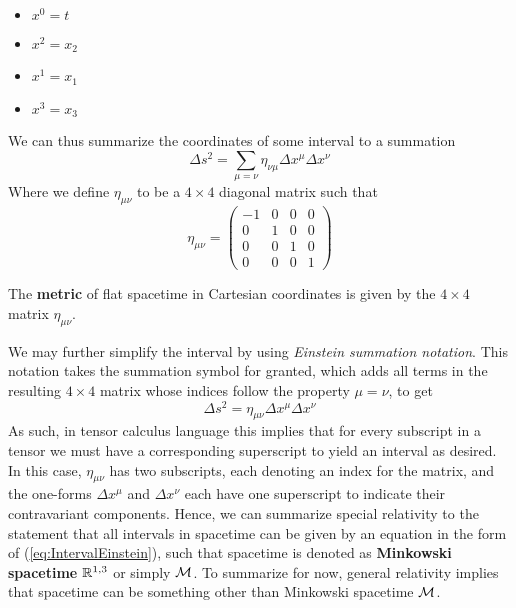 \documentclass{article}
\begin{document}
	 	\begin{multicols}{4}
	 		\begin{itemize}
	 			\item $x^0 = t$
	 			\item $x^2 = x_2$
	 			\item $x^1 = x_1$
	 			\item $x^3 = x_3$
	 		\end{itemize}
	 	\end{multicols}
	 	We can thus summarize the coordinates of some interval to a summation
	 	$$ \Delta s^2 = \sum_{\mu=\nu} \eta_{\nu\mu}\Delta x^\mu \Delta x^\nu$$ 
	 	Where we define $\eta_{\mu\nu}$ to be a $4\times4$ diagonal matrix such that
	 	$$ \eta_{\mu\nu} = \begin{pmatrix}
	 		-1	&	0	&	0	&	0\\
	 		0	&	1	&	0	&	0\\
	 		0	&	0	&	1	&	0\\
	 		0	&	0	&	0	&	1
	 	\end{pmatrix}$$ 
	 	\begin{defn}
	 		The \textbf{metric} of flat spacetime in Cartesian coordinates is given by the $4 \times 4$ matrix $\eta_{\mu\nu}$.
	 	\end{defn}
	 	We may further simplify the interval by using \textit{Einstein summation notation}. This notation takes the summation symbol for granted, which adds all terms in the resulting $4\times4$ matrix whose indices follow the property $\mu=\nu$, to get
 		\begin{equation}
 			\label{eq:IntervalEinstein}
 			\Delta s^2 = \eta_{\mu\nu} \Delta x^\mu \Delta x^\nu
 		\end{equation}
 		As such, in tensor calculus language this implies that for every subscript in a tensor we must have a corresponding superscript to yield an interval as desired. In this case, $\eta_{\mu\nu}$ has two subscripts, each denoting an index for the matrix, and the one-forms $\Delta x^\mu$ and $\Delta x^\nu$ each have one superscript to indicate their contravariant components. Hence, we can summarize special relativity to the statement that all intervals in spacetime can be given by an equation in the form of (\ref{eq:IntervalEinstein}), such that spacetime is denoted as \textbf{Minkowski spacetime} $\mathbb{R}^{1,3}$ or simply $\mathcal{M}$. To summarize for now, general relativity implies that spacetime can be something other than Minkowski spacetime $\mathcal{M}$.
 		
\end{document}
